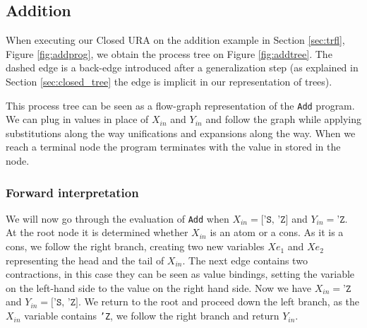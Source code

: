 \documentclass[10pt]{../sigplanconf}
\begin{document}
\subsection{Addition}
When executing our Closed URA on the addition example in Section
\ref{sec:trfl}, Figure \ref{fig:addprog}, we obtain the process tree
on Figure \ref{fig:addtree}. The dashed edge is a back-edge introduced
after a generalization step (as explained in Section
\ref{sec:closed_tree} the edge is implicit in our representation
of trees).

This process tree can be seen as a flow-graph representation of the
\texttt{Add} program. We can plug in values in place of $X_{in}$ and
$Y_{in}$ and follow the graph while applying substitutions along the
way unifications and expansions along the way. When we reach a terminal
node the program terminates with the value in stored in the node.

\subsubsection{Forward interpretation}
We will now go through the evaluation of \texttt{Add} when $X_{in} =
\texttt{['S, 'Z]}$ and $Y_{in} = \texttt{'Z}$. At the root node it is
determined whether $X_{in}$ is an atom or a cons. As it is a cons, we
follow the right branch, creating two new variables $Xe_1$ and $Xe_2$
representing the head and the tail of $X_{in}$. The next edge contains
two contractions, in this case they can be seen as value bindings,
setting the variable on the left-hand side to the value on the right
hand side. Now we have $X_{in} = \texttt{'Z}$ and $Y_{in} =
\texttt{['S, 'Z]}$. We return to the root and proceed down the left
branch, as the $X_{in}$ variable contains \texttt{'Z}, we follow the
right branch and return $Y_{in}$.
\end{document}
